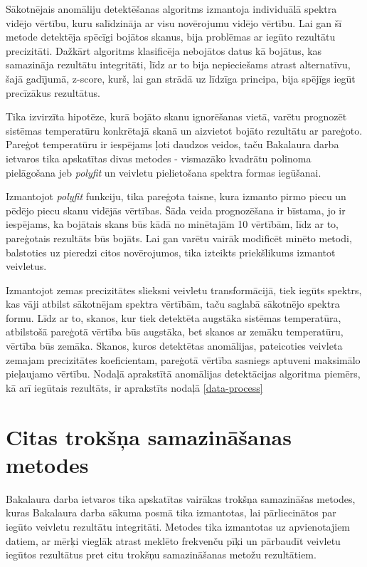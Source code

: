 Sākotnējais anomāliju detektēšanas algoritms izmantoja individuālā spektra vidējo vērtību, kuru salīdzināja ar visu novērojumu vidējo vērtību. Lai gan šī metode detektēja spēcīgi bojātos skanus, bija problēmas ar iegūto rezultātu precizitāti. Dažkārt algoritms klasificēja nebojātos datus kā bojātus, kas samazināja rezultātu integritāti, līdz ar to bija nepieciešams atrast alternatīvu, šajā gadījumā, z-score, kurš, lai gan strādā uz līdzīga principa, bija spējīgs iegūt precīzākus rezultātus.

Tika izvirzīta hipotēze, kurā bojāto skanu ignorēšanas vietā, varētu prognozēt sistēmas temperatūru konkrētajā skanā un aizvietot bojāto rezultātu ar pareģoto. Pareģot temperatūru ir iespējams ļoti daudzos veidos, taču Bakalaura darba ietvaros tika apskatītas divas metodes - vismazāko kvadrātu polinoma pielāgošana jeb \textit{polyfit} un veivletu pielietošana spektra formas iegūšanai.

Izmantojot \textit{polyfit} funkciju, tika pareģota taisne, kura izmanto pirmo piecu un pēdējo piecu skanu vidējās vērtības. Šāda veida prognozēšana ir bīstama, jo ir iespējams, ka bojātais skans būs kādā no minētajām 10 vērtībām, līdz ar to, pareģotais rezultāts būs bojāts. Lai gan varētu vairāk modificēt minēto metodi, balstoties uz pieredzi citos novērojumos, tika izteikts priekšlikums izmantot veivletus. 

Izmantojot zemas precizitātes slieksni veivletu transformācijā, tiek iegūts spektrs, kas vāji atbilst sākotnējam spektra vērtībām, taču saglabā sākotnējo spektra formu. Līdz ar to, skanos, kur tiek detektēta augstāka sistēmas temperatūra, atbilstošā pareģotā vērtība būs augstāka, bet skanos ar zemāku temperatūru, vērtība būs zemāka. Skanos, kuros detektētas anomālijas, pateicoties veivleta zemajam precizitātes koeficientam, pareģotā vērtība sasniegs aptuveni maksimālo pieļaujamo vērtību. Nodaļā aprakstītā anomālijas detektācijas algoritma piemērs, kā arī iegūtais rezultāts, ir aprakstīts nodaļā \ref{data-process}


\section{Citas trokšņa samazināšanas metodes}

Bakalaura darba ietvaros tika apskatītas vairākas trokšņa samazināšas metodes, 
kuras Bakalaura darba sākuma posmā tika izmantotas, lai pārliecinātos par iegūto veivletu rezultātu integritāti. Metodes tika izmantotas uz apvienotajiem datiem, ar mērķi vieglāk atrast meklēto frekvenču pīķi un pārbaudīt veivletu iegūtos rezultātus pret citu trokšņu samazināšanas metožu rezultātiem.

